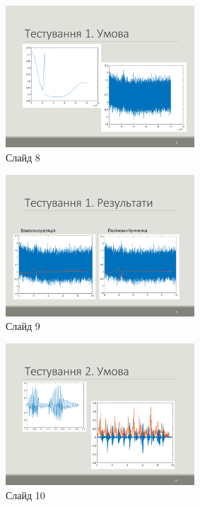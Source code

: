 \documentclass{thesis_utf8}
\begin{document}
\begin{figure}[h]
    \centering
    \includegraphics[width=0.63\textwidth]{slides/slide08.png}
    \caption{Слайд 8}
\end{figure}

\begin{figure}[h]
    \centering
    \includegraphics[width=0.63\textwidth]{slides/slide09.png}
    \caption{Слайд 9}
\end{figure}

\begin{figure}[h]
    \centering
    \includegraphics[width=0.63\textwidth]{slides/slide10.png}
    \caption{Слайд 10}
\end{figure}
\end{document}
